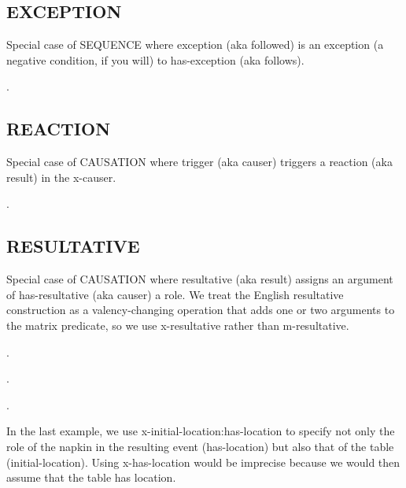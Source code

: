 \documentclass[a4paper]{article}
\newcommand{\fr}[1]{\textsf{#1}}
\newcommand{\rl}[1]{\textsf{#1}}
\begin{document}
\newpage\subsection{ \fr{EXCEPTION}}
\label{sec:EXCEPTION}

Special case of \fr{SEQUENCE} where \rl{exception} (aka \rl{followed}) is an
exception (a negative condition, if you will) to \rl{has-exception} (aka \rl{follows}).

\ex.

\newpage\subsection{ \fr{REACTION}}
\label{sec:REACTION}

Special case of \fr{CAUSATION} where \rl{trigger} (aka \rl{causer}) triggers a
\rl{reaction} (aka \rl{result}) in the \rl{x-causer}.

\ex.

\newpage\subsection{ \fr{RESULTATIVE}}
\label{sec:RESULTATIVE}

Special case of \fr{CAUSATION} where \rl{resultative} (aka \rl{result}) assigns
an argument of \rl{has-resultative} (aka \rl{causer}) a role. We treat the
English resultative construction as a valency-changing operation that adds one
or two arguments to the matrix predicate, so we use \rl{x-resultative} rather
than \rl{m-resultative}.

\ex.

\ex.

\ex.

In the last example, we use \rl{x-initial-location:has-location} to specify not
only the role of the napkin in the resulting event (\rl{has-location}) but also
that of the table (\rl{initial-location}). Using \rl{x-has-location} would be
imprecise because we would then assume that the table has \rl{location}.
\end{document}
